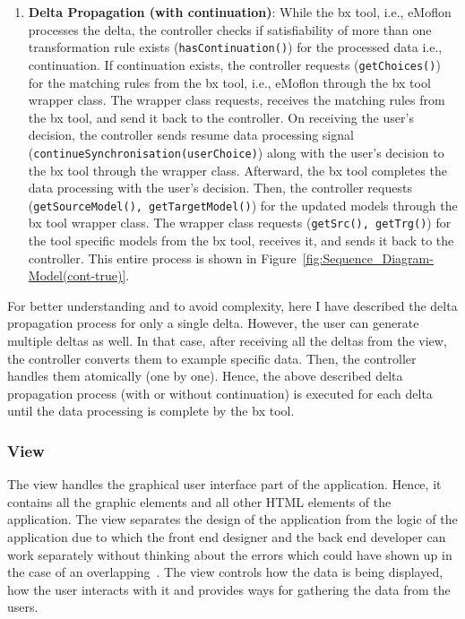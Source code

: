 \begin{enumerate}
	\item {\textbf{Delta Propagation (with continuation)}: While the bx tool, i.e., eMoflon processes the delta, the controller checks if satisfiability of more than one transformation rule exists (\texttt{hasContinuation()}) for the processed data i.e., continuation. If continuation exists, the controller requests (\texttt{getChoices()}) for the matching rules from the bx tool, i.e., eMoflon through the bx tool wrapper class. The wrapper class requests, receives the matching rules from the bx tool, and send it back to the controller. On receiving the user's decision, the controller sends resume data processing signal (\texttt{continueSynchronisation(userChoice)}) along with the user's decision to the bx tool through the wrapper class. Afterward, the bx tool completes the data processing with the user's decision. Then, the controller requests (\texttt{getSourceModel(), getTargetModel()}) for the updated models through the bx tool wrapper class. The wrapper class requests (\texttt{getSrc(), getTrg()}) for the tool specific models from the bx tool, receives it, and sends it back to the controller. This entire process is shown in Figure~\ref{fig:Sequence_Diagram-Model(cont-true)}.}
\end{enumerate}

For better understanding and to avoid complexity, here I have described the delta propagation process for only a single delta. However, the user can generate multiple deltas as well. In that case, after receiving all the deltas from the view, the controller converts them to example specific data. Then, the controller handles them atomically (one by one). Hence, the above described delta propagation process (with or without continuation) is executed for each delta until the data processing is complete by the bx tool. 

\subsubsection{View}\label{subsubsec:design_view}
The view handles the graphical user interface part of the application. Hence, it contains all the graphic elements and all other HTML elements of the application. The view separates the design of the application from the logic of the application due to which the front end designer and the back end developer can work separately without thinking about the errors which could have shown up in the case of an overlapping~\cite{designpattern-headfirst}\cite{mvc-arch}. The view controls how the data is being displayed, how the user interacts with it and provides ways for gathering the data from the users.

